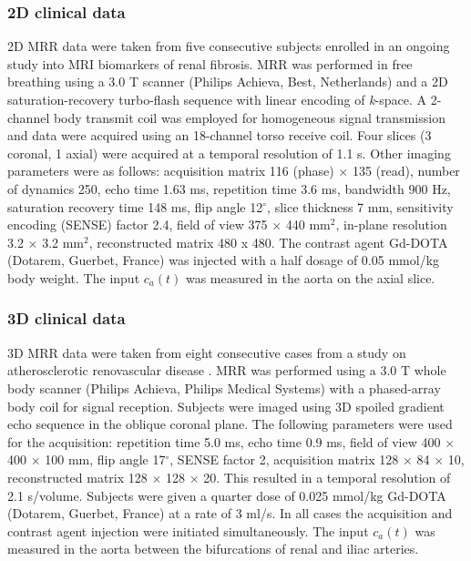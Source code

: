 \documentclass[num-refs]{wiley-article}
\newcommand{\ca}{c_a}
\begin{document}
\subsubsection{2D clinical data}

2D MRR data were taken from five consecutive subjects enrolled in an ongoing study into MRI biomarkers of renal fibrosis. MRR was performed in free breathing using a 3.0 T scanner (Philips Achieva, Best, Netherlands) and a 2D saturation-recovery turbo-flash sequence with linear encoding of {\em k}-space. A 2-channel body transmit coil was employed for homogeneous signal transmission and data were acquired using an 18-channel torso receive coil. Four slices (3 coronal, 1 axial) were acquired at a temporal resolution of 1.1 s. Other imaging parameters were as follows: acquisition matrix 116 (phase) $\times$ 135 (read), number of dynamics 250, echo time 1.63 ms, repetition time 3.6 ms, bandwidth 900 Hz, saturation recovery time 148 ms, flip angle 12$^{\circ}$, slice thickness 7 mm, sensitivity encoding (SENSE) factor 2.4, field of view 375 $\times$ 440 mm$^2$, in-plane resolution 3.2 $\times$ 3.2 mm$^{2}$, reconstructed matrix 480 x 480. The contrast agent Gd-DOTA (Dotarem, Guerbet, France) was injected with a half dosage of 0.05 mmol/kg body weight. The input $\ca(t)$ was measured in the aorta on the axial slice. 

\subsubsection{3D clinical data}

3D MRR data were taken from eight consecutive cases from a study on atherosclerotic renovascular disease \cite{Lim2013}. MRR was performed using a 3.0 T whole body scanner (Philips Achieva, Philips Medical Systems) with a phased-array body coil for signal reception. Subjects were imaged using 3D spoiled gradient echo sequence in the oblique coronal plane. The following parameters were used for the acquisition: repetition time 5.0 ms, echo time 0.9 ms, field of view 400 $\times$ 400 $\times$ 100 mm, flip angle 17$^{\circ}$, SENSE factor 2, acquisition matrix 128 $\times$ 84 $\times$ 10, reconstructed matrix 128 $\times$ 128 $\times$ 20. This resulted in a temporal resolution of 2.1 s/volume. Subjects were given a quarter dose of 0.025 mmol/kg Gd-DOTA (Dotarem, Guerbet, France) at a rate of 3 ml/s. In all cases the acquisition and contrast agent injection were initiated simultaneously. The input $\ca(t)$ was measured in the aorta between the bifurcations of renal and iliac arteries.
\end{document}
